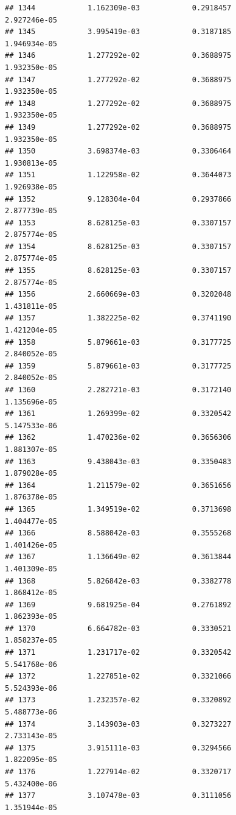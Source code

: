\documentclass[
]{article}
\begin{document}
\begin{verbatim}
## 1344            1.162309e-03            0.2918457            2.927246e-05
## 1345            3.995419e-03            0.3187185            1.946934e-05
## 1346            1.277292e-02            0.3688975            1.932350e-05
## 1347            1.277292e-02            0.3688975            1.932350e-05
## 1348            1.277292e-02            0.3688975            1.932350e-05
## 1349            1.277292e-02            0.3688975            1.932350e-05
## 1350            3.698374e-03            0.3306464            1.930813e-05
## 1351            1.122958e-02            0.3644073            1.926938e-05
## 1352            9.128304e-04            0.2937866            2.877739e-05
## 1353            8.628125e-03            0.3307157            2.875774e-05
## 1354            8.628125e-03            0.3307157            2.875774e-05
## 1355            8.628125e-03            0.3307157            2.875774e-05
## 1356            2.660669e-03            0.3202048            1.431811e-05
## 1357            1.382225e-02            0.3741190            1.421204e-05
## 1358            5.879661e-03            0.3177725            2.840052e-05
## 1359            5.879661e-03            0.3177725            2.840052e-05
## 1360            2.282721e-03            0.3172140            1.135696e-05
## 1361            1.269399e-02            0.3320542            5.147533e-06
## 1362            1.470236e-02            0.3656306            1.881307e-05
## 1363            9.438043e-03            0.3350483            1.879028e-05
## 1364            1.211579e-02            0.3651656            1.876378e-05
## 1365            1.349519e-02            0.3713698            1.404477e-05
## 1366            8.588042e-03            0.3555268            1.401426e-05
## 1367            1.136649e-02            0.3613844            1.401309e-05
## 1368            5.826842e-03            0.3382778            1.868412e-05
## 1369            9.681925e-04            0.2761892            1.862393e-05
## 1370            6.664782e-03            0.3330521            1.858237e-05
## 1371            1.231717e-02            0.3320542            5.541768e-06
## 1372            1.227851e-02            0.3321066            5.524393e-06
## 1373            1.232357e-02            0.3320892            5.488773e-06
## 1374            3.143903e-03            0.3273227            2.733143e-05
## 1375            3.915111e-03            0.3294566            1.822095e-05
## 1376            1.227914e-02            0.3320717            5.432400e-06
## 1377            3.107478e-03            0.3111056            1.351944e-05

\end{verbatim}
\end{document}
